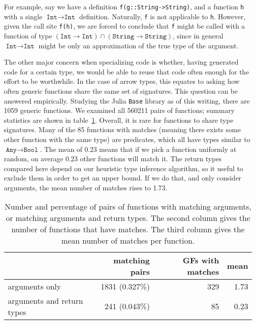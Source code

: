 For example, say we have a definition \texttt{f(g::String->String)},
and a function \texttt{h} with a single $\texttt{Int}\rightarrow\texttt{Int}$ definition.
Naturally, \texttt{f} is not applicable to \texttt{h}.
However, given the call site \texttt{f(h)}, we are forced to conclude
that \texttt{f} might be called with a function of type
\mbox{$(\texttt{Int}\rightarrow\texttt{Int})\cap(\texttt{String}\rightarrow\texttt{String})$},
since in general $\texttt{Int}\rightarrow\texttt{Int}$ might be only an
approximation of the true type of the argument.


The other major concern when specializing code is whether, having generated code
for a certain type, we would be able to reuse that code often enough for the
effort to be worthwhile.
In the case of arrow types, this equates to asking how often generic functions
share the same set of signatures.
This question can be answered empirically.
Studying the Julia \texttt{Base} library as of this writing, there are 1059
generic functions. We examined all 560211 pairs of functions; summary
statistics are shown in table~\ref{tab:matchingfuncs}.
Overall, it is rare for functions to share type signatures.
Many of the 85 functions with matches (meaning there exists some other function
with the same type) are predicates, which all have types similar to
$\texttt{Any}\rightarrow \texttt{Bool}$. The mean of 0.23 means that if we
pick a function uniformly at random, on average 0.23 other functions will
match it.
The return types compared here depend on our heuristic type inference algorithm,
so it useful to exclude them in order to get an upper bound.
If we do that, and only consider arguments, the mean number of matches rises to 1.73.

\begin{table}
  \begin{center}
    \begin{tabular}{|l|r|r|r|}\hline
    &  \textbf{matching pairs} & \textbf{GFs with matches} & \textbf{mean} \\
      \hline \hline
arguments only             & 1831 (0.327\%)  &   329       &          1.73 \\
\hline
arguments and return types &  241 (0.043\%)  &   85        &          0.23 \\
\hline
\end{tabular}
\end{center}
  \caption[Degree of reuse of function types]{
\small{
    Number and percentage of pairs of functions with matching arguments, or
    matching arguments and return types. The second column gives the number of
    functions that have matches. The third column gives the
    mean number of matches per function.
}
  }
  \label{tab:matchingfuncs}
\end{table}

